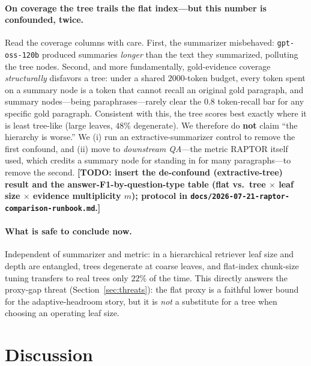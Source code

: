 \documentclass[11pt]{article}
\newcommand{\todo}[1]{{\color{red}\textbf{[TODO: #1]}}}
\begin{document}
\paragraph{On coverage the tree trails the flat index---but this number is confounded, twice.}
Read the coverage columns with care. First, the summarizer misbehaved: \texttt{gpt-oss-120b}
produced summaries \emph{longer} than the text they summarized, polluting the tree nodes. Second,
and more fundamentally, gold-evidence coverage \emph{structurally} disfavors a tree: under a
shared $2000$-token budget, every token spent on a summary node is a token that cannot recall an
original gold paragraph, and summary nodes---being paraphrases---rarely clear the $0.8$
token-recall bar for any specific gold paragraph. Consistent with this, the tree scores best
exactly where it is least tree-like (large leaves, $48\%$ degenerate). We therefore do
\textbf{not} claim ``the hierarchy is worse.'' We (i) run an extractive-summarizer control to
remove the first confound, and (ii) move to \emph{downstream QA}---the metric RAPTOR itself used,
which credits a summary node for standing in for many paragraphs---to remove the second.
\todo{insert the de-confound (extractive-tree) result and the answer-F1-by-question-type table
(flat vs.\ tree $\times$ leaf size $\times$ evidence multiplicity $m$); protocol in
\texttt{docs/2026-07-21-raptor-comparison-runbook.md}.}

\paragraph{What is safe to conclude now.} Independent of summarizer and metric: in a hierarchical
retriever leaf size and depth are entangled, trees degenerate at coarse leaves, and flat-index
chunk-size tuning transfers to real trees only $22\%$ of the time. This directly answers the
proxy-gap threat (Section~\ref{sec:threats}): the flat proxy is a faithful lower bound for the
adaptive-headroom story, but it is \emph{not} a substitute for a tree when choosing an operating
leaf size.

\section{Discussion}
\label{sec:discussion}
\end{document}
